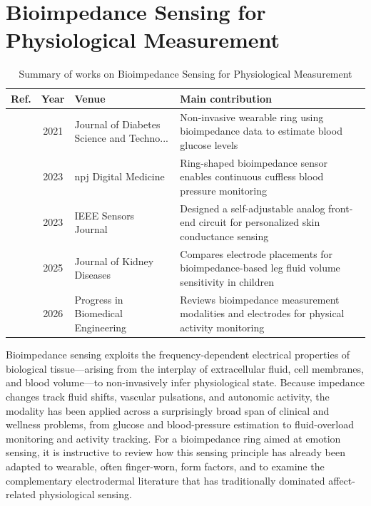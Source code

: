 \section{Bioimpedance Sensing for Physiological Measurement}\label{sec:theme6}
\begin{table}[!t]
\centering
\renewcommand{\arraystretch}{1.2}
\caption{Summary of works on Bioimpedance Sensing for Physiological Measurement}\label{tab:theme6}
\begin{tabularx}{\textwidth}{@{}l c p{3.6cm} X@{}}
\toprule
\textbf{Ref.} & \textbf{Year} & \textbf{Venue} & \textbf{Main contribution} \\
\midrule
\cite{sanai2021evaluation} & 2021 & Journal of Diabetes Science and Techno... & Non-invasive wearable ring using bioimpedance data to estimate blood glucose levels \\
\cite{sel2023continuous} & 2023 & npj Digital Medicine & Ring-shaped bioimpedance sensor enables continuous cuffless blood pressure monitoring \\
\cite{miranda2023self} & 2023 & IEEE Sensors Journal & Designed a self-adjustable analog front-end circuit for personalized skin conductance sensing \\
\cite{noori2025sensitivity} & 2025 & Journal of Kidney Diseases & Compares electrode placements for bioimpedance-based leg fluid volume sensitivity in children \\
\cite{jacobs2026advancing} & 2026 & Progress in Biomedical Engineering & Reviews bioimpedance measurement modalities and electrodes for physical activity monitoring \\
\bottomrule
\end{tabularx}
\end{table}

Bioimpedance sensing exploits the frequency-dependent electrical properties of biological tissue---arising from the interplay of extracellular fluid, cell membranes, and blood volume---to non-invasively infer physiological state. Because impedance changes track fluid shifts, vascular pulsations, and autonomic activity, the modality has been applied across a surprisingly broad span of clinical and wellness problems, from glucose and blood-pressure estimation to fluid-overload monitoring and activity tracking. For a bioimpedance ring aimed at emotion sensing, it is instructive to review how this sensing principle has already been adapted to wearable, often finger-worn, form factors, and to examine the complementary electrodermal literature that has traditionally dominated affect-related physiological sensing.

